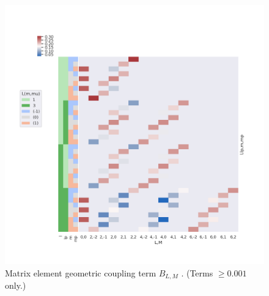 \documentclass[10pt]{article}
\begin{document}
\begin{figure}[]
\begin{center}
\includegraphics[width=\textwidth,height=\dimexpr\textheight-4\baselineskip-\abovecaptionskip-\belowcaptionskip\relax,keepaspectratio]{figures/basisPlots_090822_BLMtable.png}
\caption{Matrix element geometric coupling term \(B_{L,M}\) . (Terms \(\ge0.001\) only.)\label{776753}}
\end{center}
\end{figure}
\end{document}
